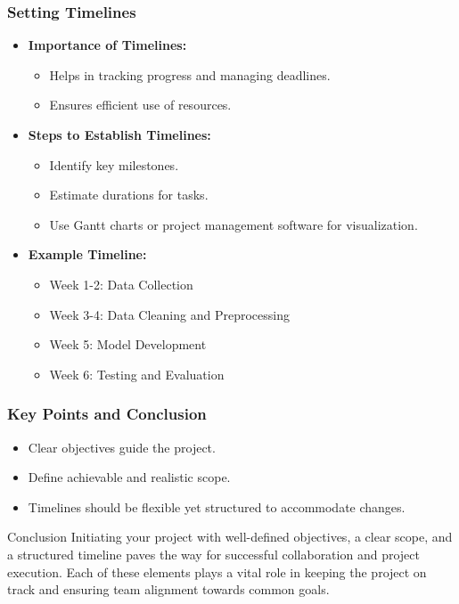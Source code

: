 \documentclass[aspectratio=169]{beamer}
\begin{document}
\begin{frame}[fragile]
    \frametitle{Setting Timelines}
    \begin{itemize}
        \item \textbf{Importance of Timelines:}
        \begin{itemize}
            \item Helps in tracking progress and managing deadlines.
            \item Ensures efficient use of resources.
        \end{itemize}
        
        \item \textbf{Steps to Establish Timelines:}
        \begin{itemize}
            \item Identify key milestones.
            \item Estimate durations for tasks.
            \item Use Gantt charts or project management software for visualization.
        \end{itemize}
        
        \item \textbf{Example Timeline:}
        \begin{itemize}
            \item Week 1-2: Data Collection
            \item Week 3-4: Data Cleaning and Preprocessing
            \item Week 5: Model Development
            \item Week 6: Testing and Evaluation 
        \end{itemize}
    \end{itemize}
\end{frame}

\begin{frame}[fragile]
    \frametitle{Key Points and Conclusion}
    \begin{itemize}
        \item Clear objectives guide the project.
        \item Define achievable and realistic scope.
        \item Timelines should be flexible yet structured to accommodate changes.
    \end{itemize}
    
    \begin{block}{Conclusion}
        Initiating your project with well-defined objectives, a clear scope, and a structured timeline paves the way for successful collaboration and project execution. Each of these elements plays a vital role in keeping the project on track and ensuring team alignment towards common goals.
    \end{block}
\end{frame}
\end{document}
